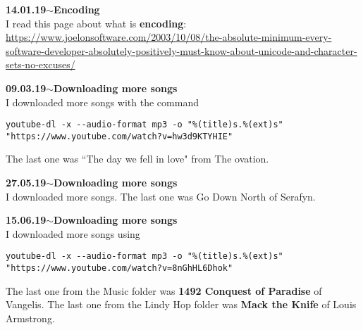\documentclass[11pt,a4paper]{article}
\newenvironment{loggentry}[2]%
{\noindent\textbf{#1}\hspace{1cm}$\mathbf{\sim}$\text{ }\textbf{#2}\\}{\vspace{0.5cm}}
\begin{document}
\begin{loggentry}{14.01.19}{Encoding}
I read this page about what is \textbf{encoding}:\\
\url{https://www.joelonsoftware.com/2003/10/08/the-absolute-minimum-every-software-developer-absolutely-positively-must-know-about-unicode-and-character-sets-no-excuses/}
\end{loggentry}

\begin{loggentry}{09.03.19}{Downloading more songs}
I downloaded more songs with the command
\begin{verbatim}
youtube-dl -x --audio-format mp3 -o "%(title)s.%(ext)s" "https://www.youtube.com/watch?v=hw3d9KTYHIE"
\end{verbatim}
The last one was ``The day we fell in love" from The ovation.
\end{loggentry}


\begin{loggentry}{27.05.19}{Downloading more songs}

I downloaded more songs. The last one was Go Down North of Serafyn.

\end{loggentry}


\begin{loggentry}{15.06.19}{Downloading more songs}

I downloaded more songs using
\begin{verbatim}
youtube-dl -x --audio-format mp3 -o "%(title)s.%(ext)s" "https://www.youtube.com/watch?v=8nGhHL6Dhok"
\end{verbatim}
The last one from the Music folder was \textbf{1492 Conquest of Paradise} of Vangelis. The last one from the Lindy Hop folder was \textbf{Mack the Knife} of Louis Armstrong.

\end{loggentry}
\end{document}
